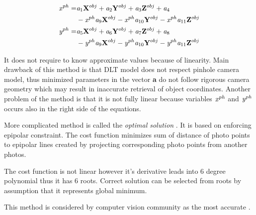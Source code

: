 \documentclass[a4paper,12pt]{article}
\newcommand{\evect}[1]{
{\bf #1}
}
\newcommand{\escal}[1]{
{\it #1}
}
\newcommand{\term}[1]{
{\it #1}%
}
\begin{document}
\begin{equation}
\begin{split}
\escal{x}^{ph} =& \escal{a}_{1}\evect{X}^{obj} + 
                                  \escal{a}_{2}\evect{Y}^{obj} + 
                                  \escal{a}_{3}\evect{Z}^{obj} +
                                  \escal{a}_{4} \\
				  &- \escal{x}^{ph} \escal{a}_{9}\evect{X}^{obj} -
                                  \escal{x}^{ph} \escal{a}_{10}\evect{Y}^{obj} - 
                                  \escal{x}^{ph} \escal{a}_{11}\evect{Z}^{obj} \\
\escal{y}^{ph} =& \escal{a}_{5}\evect{X}^{obj} + 
                                  \escal{a}_{6}\evect{Y}^{obj} + 
                                  \escal{a}_{7}\evect{Z}^{obj} +                                 
                                  \escal{a}_{8}\\
				  &- \escal{y}^{ph} \escal{a}_{9}\evect{X}^{obj} -
                                  \escal{y}^{ph} \escal{a}_{10}\evect{Y}^{obj} - 
                                  \escal{y}^{ph} \escal{a}_{11}\evect{Z}^{obj}    
\end{split}
\end{equation}
 

It does not require to know approximate values because of linearity. 
Main drawback of this method is that DLT model does not respect pinhole camera model, thus
minimized parameters in the vector \evect{a} do not follow rigorous camera geometry which 
may result in inaccurate retrieval of object coordinates. Another problem of the method 
is that it is not fully linear because variables $\escal{x}^{ph}$ and $\escal{y}^{ph}$
occurs also in the right side of the equations. 


More complicated method is called the \term{optimal solution}. 
It is based on enforcing epipolar constraint.  The cost function 
minimizes sum of distance of photo points to epipolar lines created 
by projecting corresponding photo points from another photos.

The cost function is not linear however it's derivative leads into 6 degree polynomial thus 
it has 6 roots. Correct solution can be selected from roots by assumption that it represents global minimum. 

This method is considered by computer vision community as the most accurate \cite[p. 315]{Hartley2004}.  
\end{document}
